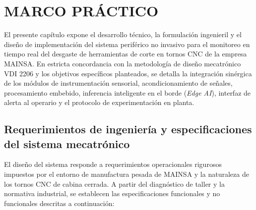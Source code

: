
\newpage
\section{MARCO PRÁCTICO}
\label{sec:marco_practico}

El presente capítulo expone el desarrollo técnico, la formulación ingenieril y el diseño de implementación del sistema periférico no invasivo para el monitoreo en tiempo real del desgaste de herramientas de corte en tornos CNC de la empresa MAINSA. En estricta concordancia con la metodología de diseño mecatrónico VDI 2206 y los objetivos específicos planteados, se detalla la integración sinérgica de los módulos de instrumentación sensorial, acondicionamiento de señales, procesamiento embebido, inferencia inteligente en el borde (\textit{Edge AI}), interfaz de alerta al operario y el protocolo de experimentación en planta.

\subsection{Requerimientos de ingeniería y especificaciones del sistema mecatrónico}
\label{subsec:requerimientos_sistema}

El diseño del sistema responde a requerimientos operacionales rigurosos impuestos por el entorno de manufactura pesada de MAINSA y la naturaleza de los tornos CNC de cabina cerrada. A partir del diagnóstico de taller y la normativa industrial, se establecen las especificaciones funcionales y no funcionales descritas a continuación:

